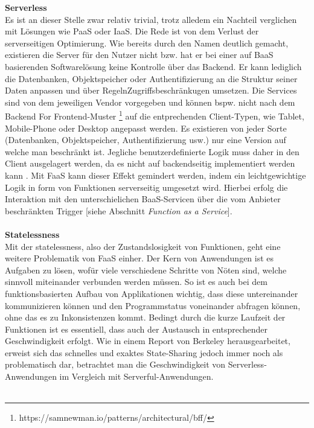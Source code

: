 \documentclass[11pt]{article}
\begin{document}
\glqq \textbf{Serverless}\grqq{}\\
Es ist an dieser Stelle zwar relativ trivial, trotz alledem ein Nachteil verglichen mit Lösungen wie PaaS oder IaaS. Die Rede ist von dem Verlust der serverseitigen Optimierung. Wie bereits durch den Namen deutlich gemacht, existieren die Server für den Nutzer nicht bzw. hat er bei einer auf BaaS basierenden Softwarelösung keine Kontrolle über das Backend. Er kann lediglich die Datenbanken, Objektspeicher oder Authentifizierung an die Struktur seiner Daten anpassen und über \glqq Regeln\grqq{}Zugriffsbeschränkugen umsetzen. Die Services sind von dem jeweiligen Vendor vorgegeben und können bspw. nicht nach dem \glqq Backend For Frontend\grqq{}-Muster \footnote{https://samnewman.io/patterns/architectural/bff/} auf die entprechenden Client-Typen, wie Tablet, Mobile-Phone oder Desktop angepasst werden. Es existieren von jeder Sorte (Datenbanken, Objektspeicher, Authentifizierung usw.) nur eine Version auf welche man beschränkt ist. Jegliche benutzerdefinierte Logik muss daher in den Client ausgelagert werden, da es nicht auf backendseitig implementiert werden kann \cite{fowler2018serverless}. Mit FaaS kann dieser Effekt gemindert werden, indem ein leichtgewichtige Logik in form von Funktionen serverseitig umgesetzt wird. Hierbei erfolg die Interaktion mit den unterschielichen BaaS-Servicen über die vom Anbieter beschränkten Trigger [siehe Abschnitt \textit{Function as a Service}]. \\\\
\glqq \textbf{Statelessness}\grqq{}\\
Mit der \glqq statelessness\grqq{}, also der Zustandslosigkeit von Funktionen, geht eine weitere Problematik von FaaS einher. Der Kern von Anwendungen ist es Aufgaben zu lösen, wofür viele verschiedene Schritte von Nöten sind, welche sinnvoll miteinander verbunden werden müssen. So ist es auch bei dem funktionsbasierten Aufbau von Applikationen wichtig, dass diese untereinander kommunizieren können und den Programmstatus voneinander abfragen können, ohne das es zu Inkonsistenzen kommt. Bedingt durch die kurze Laufzeit der Funktionen ist es essentiell, dass auch der Austausch in entsprechender Geschwindigkeit erfolgt. Wie in einem Report von Berkeley \cite{jonas2019cloud} herausgearbeitet, erweist sich das schnelles und exaktes \glqq State-Sharing\grqq{} jedoch immer noch als problematisch dar, betrachtet man die Geschwindigkeit von \glqq Serverless\grqq{}-Anwendungen im Vergleich mit \glqq Serverful\grqq{}-Anwendungen. \\\\
\end{document}
